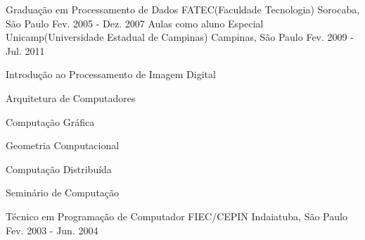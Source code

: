 \begin{cventries}
  \cventry
    {Graduação em Processamento de Dados}
    {FATEC(Faculdade Tecnologia)}
    {Sorocaba, São Paulo}
    {Fev. 2005 - Dez. 2007}
    {}
  \cventry
    {Aulas como aluno Especial}
    {Unicamp(Universidade Estadual de Campinas)}
    {Campinas, São Paulo}
    {Fev. 2009 - Jul. 2011}
    {      
      \begin{cvitems} %
        \item {Introdução ao Processamento de Imagem Digital}
        \item{Arquitetura de Computadores}
        \item{Computação Gráfica}
        \item{Geometria Computacional}
        \item{Computação Distribuída}
        \item{Seminário de Computação}
      \end{cvitems}
    }
  \cventry
  	{Técnico em Programação de Computador}
    {FIEC/CEPIN}
    {Indaiatuba, São Paulo}
    {Fev. 2003 - Jun. 2004}
    {}
\end{cventries}
